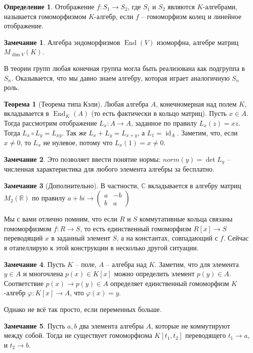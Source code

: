 \documentclass[10pt,a4paper,oneside]{book}
\theoremstyle{definition}
\newtheorem*{rem}{\color{green!50!blue}Замечание}
\newtheorem*{defn}{\color{yellow!30!red} Определение}
\newtheorem{thm}{\color{red!40!black}Теорема}
\newcommand{\mb}[1]{\mathbb{#1}}
\newcommand{\id}{\operatorname{id}}
\newcommand{\End}{\operatorname{End}}
\def\ffi{\varphi}
\def\thrm{\begin{thm}}
\def\ethrm{\end{thm}}
\def\dfn{\begin{defn}}
\def\edfn{\end{defn}}
\def\rm{\begin{rem}}
\def\erm{\end{rem}}
\begin{document}
\dfn Отображение $f \colon S_1 \to S_2$, где $S_1$ и $S_2$ являются $K$-алгебрами,
называется гомоморфизмом $K$-алгебр, если $f$ -- гомоморфизм колец и линейное отображение.
\edfn



\rm Алгебра эндоморфизмов $\End(V)$  изоморфна,  алгебре матриц $M_{\dim V}(K)$.
\erm

В теории групп любая конечная группа могла быть реализована как подгруппа в $S_n$. Оказывается, что мы давно знаем алгебру, которая играет аналогичную $S_n$ роль.





\thrm[Теорема типа Кэли] Любая алгебра $A$, конечномерная над полем $K$, вкладывается в $\End_K(A)$ (то есть фактически в кольцо матриц).
\proof Пусть $x\in A$. Тогда рассмотрим отображение $L_x \colon A \to A$, заданное по правилу $L_x(z)=xz$. Тогда $L_x\circ L_y=L_{xy}$. Так же $L_x+L_y=L_{x+y}$, а $L_1=\id_A$. Заметим, что, если $x\neq 0$, то $L_x$ не нулевое, потому что $L_x(1)=x\neq 0$.
\endproof
\ethrm

\rm Это позволяет ввести понятие нормы: $norm (y)=\det L_y$ -- численная характеристика для любого элемента алгебры за бесплатно.
\erm

\rm[Дополнительно] В частности, $\mb C$ вкладывается в алгебру матриц $M_2(\mb R)$ по правилу $a+bi \to \left( \begin{smallmatrix} a &-b\\ b & a \end{smallmatrix}\right) $
\erm



Мы с вами отлично помним, что если  $R$ и $S$ коммутативные кольца связаны гомоморфизмом $f\colon R \to S$, то есть единственный гомоморфизм $R[x] \to S$ переводящий $x$ в заданный элемент $S$, а на константах, совпадающий с $f$. Сейчас я отапеллирую к этой конструкции в несколько другой ситуации.

\rm
Пусть $K$ -- поле, $A$ -- алгебра над $K$. Заметим, что для элемента $y \in A$ и многочлена $p(x)\in K[x]$ можно определить элемент $p(y)\in A$. Соответствие $p(x) \to p(y)\in A$ определяет единственный гомоморфизм $K$-алгебр $\ffi \colon K[x]\to A$, что $\ffi(x)= y$.
\erm

Однако не всё так просто, если переменных больше.

\rm Пусть $a,b$ два элемента алгебры $A$, которые не коммутируют между собой. Тогда не существует гомоморфизма $K[t_1,t_2]$ переводящего $t_1\to a$, и $t_2 \to b$.
\erm
\end{document}
